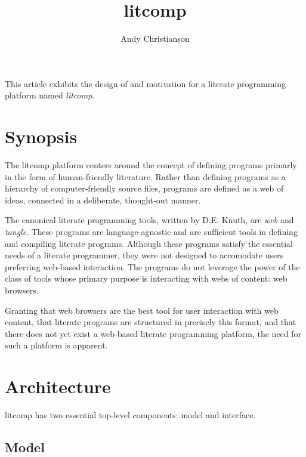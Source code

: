 \setlength{\topmargin}{-.5in}
\setlength{\textheight}{9in}
\setlength{\oddsidemargin}{.125in}
\setlength{\textwidth}{6.25in}

\title{litcomp}
\author{Andy Christianson}
\renewcommand{\today}{March 13, 2011}
\maketitle

This article exhibits the design of and motivation for a literate
programming platform named {\em litcomp}.

\section {Synopsis}

The litcomp platform centers around the concept of defining programs primarly
in the form of human-friendly literature. Rather than defining programs
as a hierarchy of computer-friendly source files, programs are defined
as a web of ideas, connected in a deliberate, thought-out manner.

The canonical literate programming tools, written by D.E. Knuth, are
{\em web} and {\em tangle}. These programs are language-agnostic and are
sufficient tools in defining and compiling literate programs. Although
these programs satisfy the essential needs of a literate programmer,
they were not designed to accomodate users preferring web-based
interaction. The programs do not leverage the power of the class of tools
whose primary purpose is interacting with webs of content: web browsers.

Granting that web browsers are the best tool for user interaction with
web content, that literate programs are structured in precisely this
format, and that there does not yet exist a web-based literate programming
platform, the need for such a platform is apparent.

\section {Architecture}

litcomp has two essential top-level components: model and interface.

\pagebreak

\subsection {Model}

